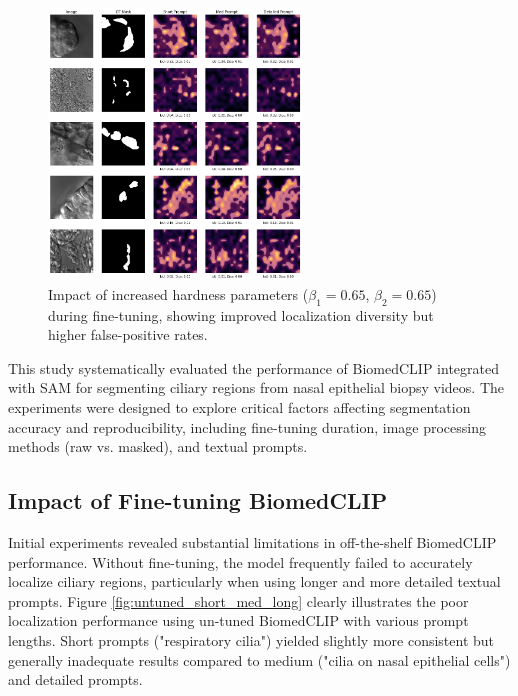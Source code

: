 \documentclass[./dissertation.tex]{subfiles}
\begin{document}
\begin{figure}
    \centering
    \includegraphics[width=0.6\textwidth]{figures/sam/fine-tuned masks long captions small train 01 09 095 005.png}
    \caption{Impact of increased hardness parameters (\(\beta_1=0.65\), \(\beta_2=0.65\)) during fine-tuning, showing improved localization diversity but higher false-positive rates.}
    \label{fig:fine_tuned_masks_small_train_01_09_095_005}
\end{figure}



This study systematically evaluated the performance of BiomedCLIP integrated with SAM for segmenting ciliary regions from nasal epithelial biopsy videos. The experiments were designed to explore critical factors affecting segmentation accuracy and reproducibility, including fine-tuning duration, image processing methods (raw vs. masked), and textual prompts.

\subsection{Impact of Fine-tuning BiomedCLIP}

Initial experiments revealed substantial limitations in off-the-shelf BiomedCLIP performance. Without fine-tuning, the model frequently failed to accurately localize ciliary regions, particularly when using longer and more detailed textual prompts. Figure \ref{fig:untuned_short_med_long} clearly illustrates the poor localization performance using un-tuned BiomedCLIP with various prompt lengths. Short prompts ("respiratory cilia") yielded slightly more consistent but generally inadequate results compared to medium ("cilia on nasal epithelial cells") and detailed prompts.
\end{document}
